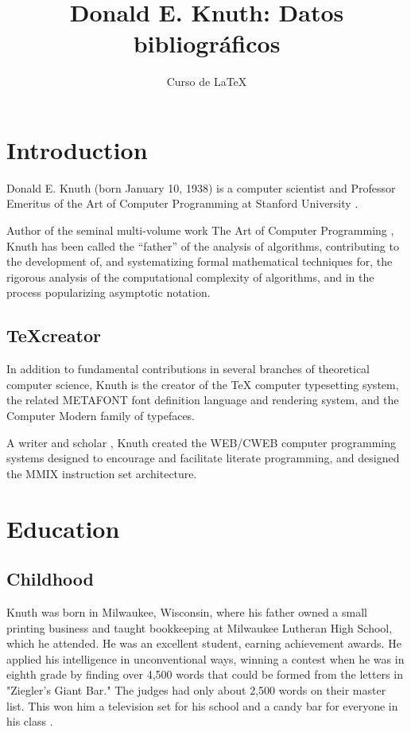 \documentclass[a4paper,11pt]{article}
\title{Donald E. Knuth: Datos bibliográficos}
\author{Curso de \LaTeX}
\begin{document}
\maketitle
\tableofcontents

\section{Introduction}
Donald E. Knuth (born January 10, 1938) is a computer scientist 
and Professor Emeritus of the Art of Computer Programming at 
Stanford University \cite{unistan}.

Author of the seminal multi-volume work The Art of Computer Programming \cite{acp}, 
Knuth has been called the ``father'' of the analysis of algorithms, 
contributing to the development of, and systematizing formal mathematical 
techniques for, the rigorous analysis of the computational complexity of 
algorithms, and in the process popularizing asymptotic notation.

\subsection{\TeX creator}

In addition to fundamental contributions in several branches of theoretical 
computer science, Knuth is the creator of the TeX computer typesetting 
system, the related METAFONT font definition language and rendering system, 
and the Computer Modern family of typefaces.

A writer and scholar \cite{joke}, Knuth created the WEB/CWEB computer programming 
systems designed to encourage and facilitate literate programming, 
and designed the MMIX instruction set architecture.

\section{Education} 

\subsection{Childhood}
Knuth was born in Milwaukee, Wisconsin, where his father owned a small 
printing business and taught bookkeeping at Milwaukee Lutheran High 
School, which he attended. He was an excellent student, earning achievement 
awards. He applied his intelligence in unconventional ways, winning a contest 
when he was in eighth grade by finding over 4,500 words that could be formed 
from the letters in "Ziegler's Giant Bar." The judges had only about 
2,500 words on their master list. This won him a television set for his school 
and a candy bar for everyone in his class \cite{concurso}.
\end{document}
